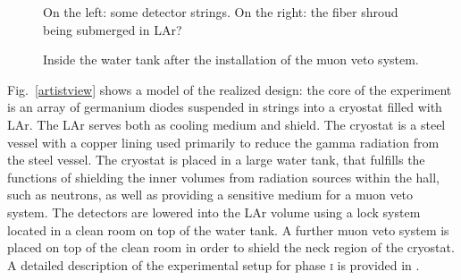 \begin{figure}
	\centering
	\caption{On the left: some detector strings. On the right: the fiber shroud being submerged in LAr?}
\end{figure}
\begin{figure}
	\centering
	\caption{Inside the water tank after the installation of the muon veto system.}
\end{figure}

Fig.~\ref{artistview} shows a model of the realized design: the core of the experiment is an array of germanium diodes suspended in strings into a cryostat filled with LAr. The LAr serves both as cooling medium and shield. The cryostat is a steel vessel with a copper lining used primarily to reduce the gamma radiation from the steel vessel. The cryostat is placed in a large water tank, that fulfills the functions of shielding the inner volumes from radiation sources within the hall, such as neutrons, as well as providing a sensitive medium for a muon veto system. The detectors are lowered into the LAr volume using a lock system located in a clean room on top of the water tank. A further muon veto system is placed on top of the clean room in order to shield the neck region of the cryostat. A detailed description of the experimental setup for phase \textsc{i} is provided in \cite{gerdadescription}.


